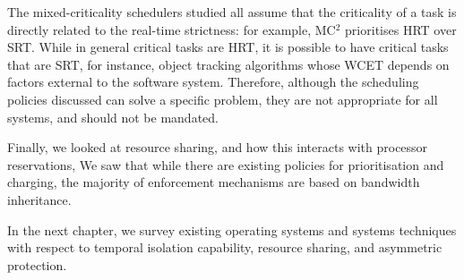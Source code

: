 The mixed-criticality schedulers studied all assume that the criticality of a task is directly
related to the real-time strictness: for example, MC$^2$ prioritises \gls{HRT} over \gls{SRT}. 
While in
general critical tasks are \gls{HRT}, it is possible to have critical tasks that are \gls{SRT}, for
instance, object tracking algorithms whose \gls{WCET} depends on factors external to the software
system. Therefore, although the scheduling policies discussed can solve a specific problem, they are
not appropriate for all systems, and should not be mandated.

Finally, we looked at resource sharing, and how this interacts with processor reservations,
We saw that while there are existing policies for prioritisation and charging, the
majority of enforcement mechanisms are based on bandwidth inheritance. 

In the next chapter, we survey existing operating systems and systems techniques with respect to
temporal isolation capability, resource sharing, and asymmetric protection.
